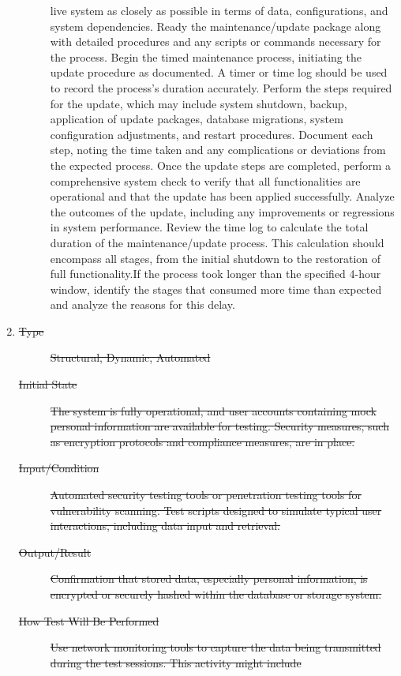 \documentclass[12pt, titlepage]{article}
\begin{document}
\begin{enumerate}[NFR-T1]
\begin{description}
{    live system as closely as possible in terms of data, configurations, and
    system dependencies. Ready the maintenance/update package along with
    detailed procedures and any scripts or commands necessary for the process.
    Begin the timed maintenance process, initiating the update procedure as
    documented. A timer or time log should be used to record the process's
    duration accurately. Perform the steps required for the update, which may
    include system shutdown, backup, application of update packages, database
    migrations, system configuration adjustments, and restart procedures.
    Document each step, noting the time taken and any complications or
    deviations from the expected process. Once the update steps are completed,
    perform a comprehensive system check to verify that all functionalities are
    operational and that the update has been applied successfully. Analyze the
    outcomes of the update, including any improvements or regressions in system
    performance. Review the time log to calculate the total duration of the
    maintenance/update process. This calculation should encompass all stages,
    from the initial shutdown to the restoration of full functionality.If the
    process took longer than the specified 4-hour window, identify the stages
    that consumed more time than expected and analyze the reasons for this
    delay.}
  \end{description}
\item \label{NFRT21}
  \begin{description}
  \item[\sout{Type}] \sout{Structural, Dynamic, Automated}
  \item[\sout{Initial State}] \sout{The system is fully operational, and user accounts
    containing mock personal information are available for testing. Security
    measures, such as encryption protocols and compliance measures, are in
    place.}
  \item[\sout{Input/Condition}] \sout{Automated security testing tools or penetration testing
    tools for vulnerability scanning. Test scripts designed to simulate typical
    user interactions, including data input and retrieval.}
  \item[\sout{Output/Result}] \sout{Confirmation that stored data, especially personal
    information, is encrypted or securely hashed within the database or storage
    system.}
  \item[\sout{How Test Will Be Performed}] \sout{Use network monitoring tools to capture the
    data being transmitted during the test sessions. This activity might include
}
\end{description}
\end{enumerate}
\end{document}
